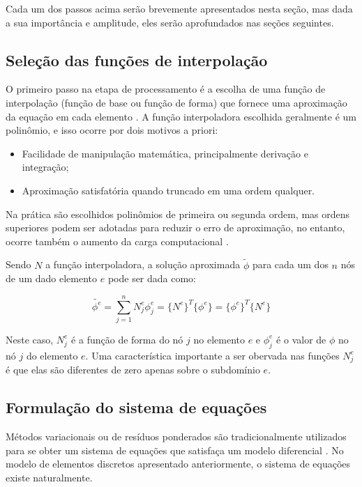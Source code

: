 Cada um dos passos acima serão brevemente apresentados nesta seção, mas dada a sua importância e amplitude, eles serão aprofundados nas seções seguintes.

\subsection{Seleção das funções de interpolação}
O primeiro passo na etapa de processamento é a escolha de uma função de interpolação (função de base ou função de forma) \citep[p. 37]{volakis} que fornece uma aproximação da equação em cada elemento \citep[p. 32]{jin}. 
A função interpoladora escolhida geralmente é um polinômio, e isso ocorre por dois motivos a priori: \citep[p. 77]{desai}

\begin{itemize}  
\item Facilidade de manipulação matemática, principalmente derivação e integração;
\item Aproximação satisfatória quando truncado em uma ordem qualquer.
\end{itemize}

Na prática são escolhidos polinômios de primeira ou segunda ordem, mas ordens superiores podem ser adotadas para reduzir o erro de aproximação, no entanto, ocorre também o aumento da carga computacional \citep[p. 32]{jin}.

Sendo $N$ a função interpoladora, a solução aproximada $\tilde{\phi}$ para cada um dos $n$ nós de um dado elemento $e$ pode ser dada como:

 \begin{equation}
 	\label{eq:interpol}
		\tilde{\phi^e} = \sum_{j=1}^{n}{N_j^e \phi_j^e} = 
		\{N^e\}^T \{\phi^e\} = \{\phi^e\}^T \{N^e\}
 \end{equation}

Neste caso, $N_j^e$ é a função de forma do nó $j$ no elemento $e$ e $\phi_j^e$ é o valor de $\phi$ no nó $j$ do elemento $e$.
Uma característica importante a ser obervada nas funções $N_j^e$ é que elas são diferentes de zero apenas sobre o subdomínio $e$.

\subsection{Formulação do sistema de equações}
Métodos variacionais ou de resíduos ponderados são tradicionalmente utilizados para se obter um sistema de equações que satisfaça um modelo diferencial \citep[p. 34]{jin}. No modelo de elementos discretos apresentado anteriormente, o sistema de equações existe naturalmente.


